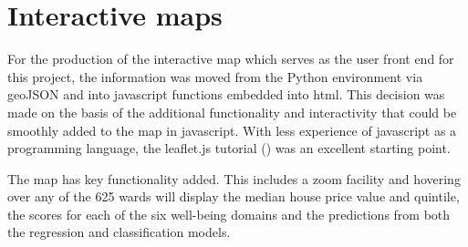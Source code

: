 \section{Interactive maps}

For the production of the interactive map which serves as the user front end for this project, the information was moved from the Python environment via geoJSON and into javascript functions embedded into html. This decision was made on the basis of the additional functionality and interactivity that could be smoothly added to the map in javascript. With less experience of javascript as a programming language, the leaflet.js tutorial (\cite{leaflet}) was an excellent starting point.

The map has key functionality added. This includes a zoom facility and hovering over any of the 625 wards will display the median house price value and quintile, the scores for each of the six well-being domains and the predictions from both the regression and classification models.







